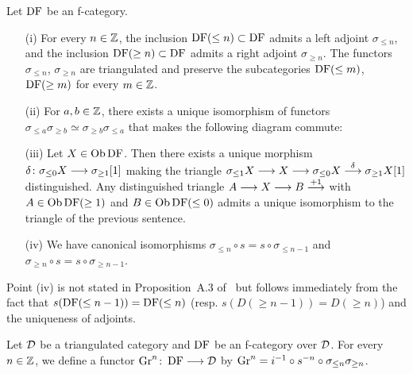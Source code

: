 \begin{proposition}
Let $\operatorname{DF}$ be an f-category.
\begin{itemize}
\item[(i)] For every $n\in\mathbb{Z}$, the inclusion $\operatorname{DF}(\leq n)\subset\operatorname{DF}$ admits a left adjoint $\sigma_{\leq n}$, and the inclusion $\operatorname{DF}(\geq n)\subset\operatorname{DF}$ admits a right adjoint $\sigma_{\geq n}$.
The functors $\sigma_{\leq n}$, $\sigma_{\geq n}$ are triangulated and preserve the subcategories $\operatorname{DF}(\leq m)$, $\operatorname{DF}(\geq m)$ for every $m\in\mathbb{Z}$.
\item[(ii)] For $a,b\in\mathbb{Z}$, there exists a unique isomorphism of functors $\sigma_{\leq a}\sigma_{\geq b}\simeq\sigma_{\geq b}\sigma_{\leq a}$ that makes the following diagram commute:

\item[(iii)] Let $X\in\operatorname{\mathrm{Ob}}\operatorname{DF}$. Then there exists a unique morphism $\delta\colon \sigma_{\leq 0}X\longrightarrow\sigma_{\geq 1}[1]$ making the triangle $\sigma_{\leq 1}X\longrightarrow X\longrightarrow\sigma_{\leq 0}X\stackrel{\delta}{\longrightarrow}\sigma_{\geq 1}X[1]$
distinguished.
Any distinguished triangle $A\longrightarrow X\longrightarrow B\stackrel{+1}{\longrightarrow}$ with $A\in\operatorname{\mathrm{Ob}}\operatorname{DF}(\geq 1)$ and $B\in\operatorname{\mathrm{Ob}}\operatorname{DF}(\leq 0)$ admits a unique isomorphism to the triangle of the previous sentence.

\item[(iv)] We have canonical isomorphisms $\sigma_{\leq n}\circ s=s\circ\sigma_{\leq n-1}$ and $\sigma_{\geq n}\circ s=s\circ\sigma_{\geq n-1}$.

\end{itemize}

\label{prop_f_category1}
\end{proposition}

Point (iv) is not stated in Proposition~A.3 of~\cite{Be1} but follows immediately from the fact that $s(\operatorname{DF}(\leq n -1))=\operatorname{DF}(\leq n)$ (resp. $s(D(\geq n-1))=D(\geq n)$) and the uniqueness
of adjoints.

\begin{definition}
Let $\mathcal{D}$ be a triangulated category and $\operatorname{DF}$ be an f-category over $\mathcal{D}$. For every $n\in\mathbb{Z}$, we define a functor $\operatorname{Gr}^n\colon \operatorname{DF}\longrightarrow\mathcal{D}$ by
$\operatorname{Gr}^n=i^{-1}\circ s^{-n}\circ\sigma_{\leq n}\sigma_{\geq n}$.

\end{definition}

